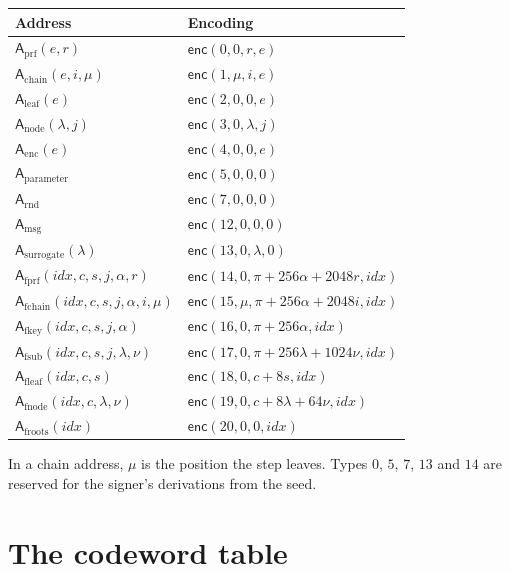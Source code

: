 \documentclass[11pt]{article}
\theoremstyle{plain}
\theoremstyle{definition}
\newcommand{\addr}{\mathsf{A}}
\newcommand{\idx}{\mathit{idx}}
\begin{document}
\begin{center}
\small
\begin{tabular}{@{}ll@{}}
\toprule
Address & Encoding\\
\midrule
$\addr_{\mathrm{prf}}(e,r)$ & $\mathsf{enc}(0,0,r,e)$\\
$\addr_{\mathrm{chain}}(e,i,\mu)$ & $\mathsf{enc}(1,\mu,i,e)$\\
$\addr_{\mathrm{leaf}}(e)$ & $\mathsf{enc}(2,0,0,e)$\\
$\addr_{\mathrm{node}}(\lambda,j)$ & $\mathsf{enc}(3,0,\lambda,j)$\\
$\addr_{\mathrm{enc}}(e)$ & $\mathsf{enc}(4,0,0,e)$\\
$\addr_{\mathrm{parameter}}$ & $\mathsf{enc}(5,0,0,0)$\\
$\addr_{\mathrm{rnd}}$ & $\mathsf{enc}(7,0,0,0)$\\
$\addr_{\mathrm{msg}}$ & $\mathsf{enc}(12,0,0,0)$\\
$\addr_{\mathrm{surrogate}}(\lambda)$ & $\mathsf{enc}(13,0,\lambda,0)$\\
$\addr_{\mathrm{fprf}}(\idx,c,s,j,\alpha,r)$ & $\mathsf{enc}(14,0,\pi+256\alpha+2048r,\idx)$\\
$\addr_{\mathrm{fchain}}(\idx,c,s,j,\alpha,i,\mu)$ & $\mathsf{enc}(15,\mu,\pi+256\alpha+2048i,\idx)$\\
$\addr_{\mathrm{fkey}}(\idx,c,s,j,\alpha)$ & $\mathsf{enc}(16,0,\pi+256\alpha,\idx)$\\
$\addr_{\mathrm{fsub}}(\idx,c,s,j,\lambda,\nu)$ & $\mathsf{enc}(17,0,\pi+256\lambda+1024\nu,\idx)$\\
$\addr_{\mathrm{fleaf}}(\idx,c,s)$ & $\mathsf{enc}(18,0,c+8s,\idx)$\\
$\addr_{\mathrm{fnode}}(\idx,c,\lambda,\nu)$ & $\mathsf{enc}(19,0,c+8\lambda+64\nu,\idx)$\\
$\addr_{\mathrm{froots}}(\idx)$ & $\mathsf{enc}(20,0,0,\idx)$\\
\bottomrule
\end{tabular}
\end{center}

In a chain address, $\mu$ is the position the step leaves. Types $0$, $5$, $7$, $13$ and $14$ are reserved for the signer's derivations from the seed.

\section{The codeword table}
\label{sec:codewords}
\end{document}
